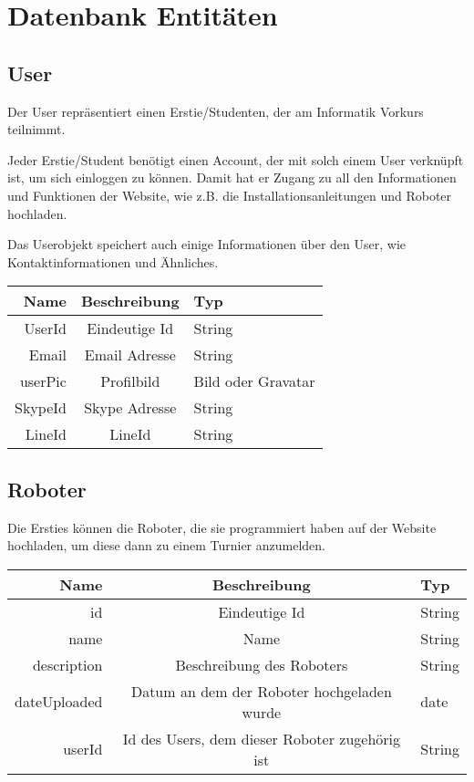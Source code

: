 \documentclass[Info_VK_Website_Dokumentation.tex]{subfiles}
\begin{document}
	
\chapter{Datenbank Entitäten}

\section{User}

Der User repräsentiert einen Erstie/Studenten, der am Informatik Vorkurs teilnimmt.

Jeder Erstie/Student benötigt einen Account, der mit solch einem User verknüpft ist, um sich einloggen zu können. Damit hat er Zugang zu all den Informationen und Funktionen der Website, wie z.B. die Installationsanleitungen und Roboter hochladen.

Das Userobjekt speichert auch einige Informationen über den User, wie Kontaktinformationen und Ähnliches.

\begin{table}[H]
\centering
\begin{tabular}{r | c | l}
\textbf{Name} & \textbf{Beschreibung} & \textbf{Typ} \\
\hline
\hline
UserId  & Eindeutige Id & String \\
\hline
Email   & Email Adresse & String \\
\hline
userPic & Profilbild   & Bild oder Gravatar \\
\hline
SkypeId & Skype Adresse & String \\
\hline
LineId  & LineId        & String \\

\end{tabular}
\end{table}


\section{Roboter}

Die Ersties können die Roboter, die sie programmiert haben auf der Website hochladen, um diese dann zu einem Turnier anzumelden.


\begin{table}[H]
\centering
\begin{tabular}{ r | c | l }
\textbf{Name} & \textbf{Beschreibung} & \textbf{Typ} \\
\hline
\hline
id       & Eindeutige Id & String \\
\hline
name     & Name          & String \\
\hline
description & Beschreibung des Roboters & String \\
\hline
dateUploaded & Datum an dem der Roboter hochgeladen wurde & date \\ 
\hline
userId & Id des Users, dem dieser Roboter zugehörig ist & String \\
\end{tabular}
\end{table}
\end{document}
